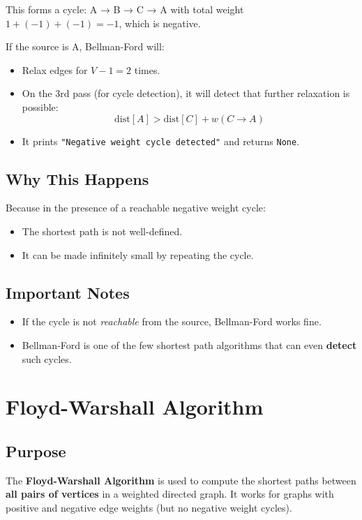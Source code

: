 \documentclass[14pt,a4paper]{extarticle}
\begin{document}
This forms a cycle: A → B → C → A with total weight \( 1 + (-1) + (-1) = -1 \), which is negative.

If the source is A, Bellman-Ford will:
\begin{itemize}
    \item Relax edges for \( V-1 = 2 \) times.
    \item On the 3rd pass (for cycle detection), it will detect that further relaxation is possible: 
    \[
    \text{dist}[A] > \text{dist}[C] + w(C \rightarrow A)
    \]
    \item It prints \texttt{"Negative weight cycle detected"} and returns \texttt{None}.
\end{itemize}

\subsection*{Why This Happens}

Because in the presence of a reachable negative weight cycle:
\begin{itemize}
    \item The shortest path is not well-defined.
    \item It can be made infinitely small by repeating the cycle.
\end{itemize}

\subsection*{Important Notes}
\begin{itemize}
    \item If the cycle is not \textit{reachable} from the source, Bellman-Ford works fine.
    \item Bellman-Ford is one of the few shortest path algorithms that can even \textbf{detect} such cycles.
\end{itemize}

\newpage
\section{Floyd-Warshall Algorithm}

\subsection{Purpose}
The \textbf{Floyd-Warshall Algorithm} is used to compute the shortest paths between \textbf{all pairs of vertices} in a weighted directed graph. It works for graphs with positive and negative edge weights (but no negative weight cycles).
\end{document}
